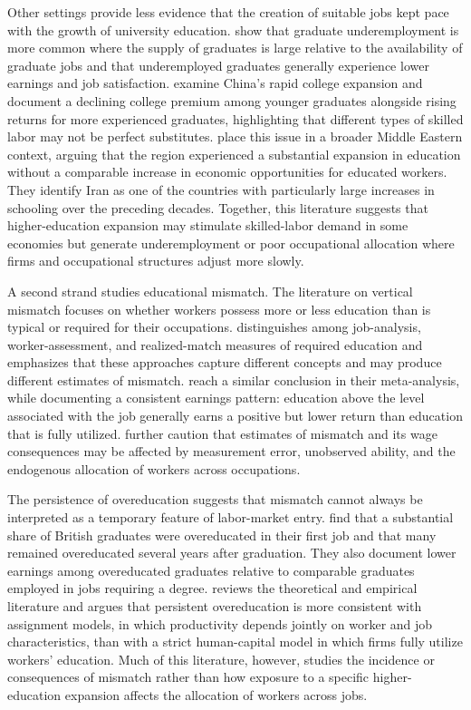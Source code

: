 Other settings provide less evidence that the creation of suitable jobs kept pace with the growth of university education. \citet{green2016} show that graduate underemployment is more common where the supply of graduates is large relative to the availability of graduate jobs and that underemployed graduates generally experience lower earnings and job satisfaction. \citet{li_nd} examine China's rapid college expansion and document a declining college premium among younger graduates alongside rising returns for more experienced graduates, highlighting that different types of skilled labor may not be perfect substitutes. \citet{campante2012} place this issue in a broader Middle Eastern context, arguing that the region experienced a substantial expansion in education without a comparable increase in economic opportunities for educated workers. They identify Iran as one of the countries with particularly large increases in schooling over the preceding decades. Together, this literature suggests that higher-education expansion may stimulate skilled-labor demand in some economies but generate underemployment or poor occupational allocation where firms and occupational structures adjust more slowly.

A second strand studies educational mismatch. The literature on vertical mismatch focuses on whether workers possess more or less education than is typical or required for their occupations. \citet{hartog2000} distinguishes among job-analysis, worker-assessment, and realized-match measures of required education and emphasizes that these approaches capture different concepts and may produce different estimates of mismatch. \citet{groot2000} reach a similar conclusion in their meta-analysis, while documenting a consistent earnings pattern: education above the level associated with the job generally earns a positive but lower return than education that is fully utilized. \citet{leuven2011} further caution that estimates of mismatch and its wage consequences may be affected by measurement error, unobserved ability, and the endogenous allocation of workers across occupations.

The persistence of overeducation suggests that mismatch cannot always be interpreted as a temporary feature of labor-market entry. \citet{dolton2000} find that a substantial share of British graduates were overeducated in their first job and that many remained overeducated several years after graduation. They also document lower earnings among overeducated graduates relative to comparable graduates employed in jobs requiring a degree. \citet{mcguinness2006} reviews the theoretical and empirical literature and argues that persistent overeducation is more consistent with assignment models, in which productivity depends jointly on worker and job characteristics, than with a strict human-capital model in which firms fully utilize workers' education. Much of this literature, however, studies the incidence or consequences of mismatch rather than how exposure to a specific higher-education expansion affects the allocation of workers across jobs.

